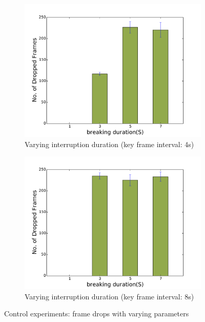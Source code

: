 \begin{figure}[htb]
\begin{subfigure}[t]{0.32\textwidth}
\centering
\includegraphics[width=\textwidth]{control_interruption_4.pdf}
\caption{Varying interruption duration (key frame interval: 4s)}
\label{fig:varying-duration-4} 
\end{subfigure}
\begin{subfigure}[t]{0.32\textwidth}
\centering
\includegraphics[width=\textwidth]{control_interruption_8.pdf}
\caption{Varying interruption duration (key frame interval: 8s)}
\label{fig:varying-duration-8} 
\end{subfigure}
\caption{Control experiments: frame drops with varying parameters}
\label{fig:control}  
\end{figure}